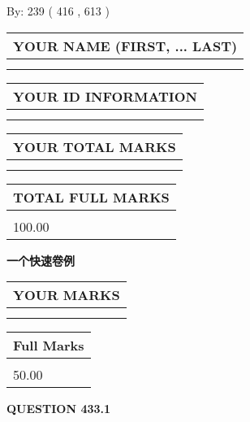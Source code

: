 \documentclass{ctexart}
\begin{document}
   
\hspace{1.0in} By: 
 239 ( 416 ,  613 )
   
   
   
   
\newpage 
\setcounter{page}{ 
   433001 } 
   
   
   
   
\noindent\begin{tabular}{|l|}
\hline
YOUR NAME (FIRST, ... LAST)  \\
\hline
 \\ 
 \\ 
\hline
\end{tabular}
\hspace{0.05in} \begin{tabular}{|l|}
\hline
 YOUR   ID   INFORMATION  \\
\hline
 \\ 
 \\ 
\hline
\end{tabular}
   
   
\vspace{0.2in}\noindent\begin{tabular}{|l|}
\hline
YOUR TOTAL MARKS  \\
\hline
 \\ 
 \\ 
\hline
\end{tabular}
\hspace{0.05in} \begin{tabular}{|l|}
\hline
TOTAL FULL MARKS  \\
\hline
 \\ 
100.00 \\
\hline
\end{tabular}
   
   
 \vspace{0.2in}
{\LARGE {\textbf{ 一个快速卷例}}}
   
   
  
\vspace{0.2in}
  
\noindent\begin{tabular}{|l|}
\hline
 YOUR MARKS  \\
\hline
 \\ 
 \\ 
\hline
\end{tabular}
\hspace{0.05in} \begin{tabular}{|l|}
\hline
 Full Marks  \\
\hline
 \\ 
50.00 \\
\hline
\end{tabular}
{\textbf{\Large{QUESTION
433.1 
}}}
  
\end{document}
